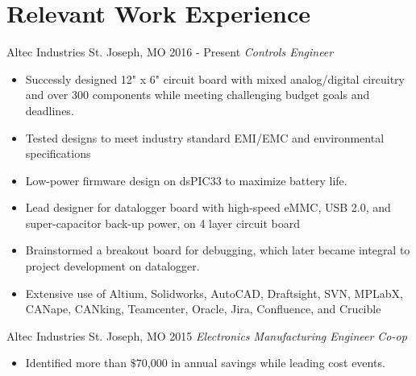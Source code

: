 \documentclass[]{bergman-cv} %
\begin{document}
\section{Relevant Work Experience}
\begin{entrylist}
\entry
{Altec Industries}
{St. Joseph, MO}
{2016 - Present}
{\emph{Controls Engineer}}
{\begin{itemize}	\setlength\itemsep{0.25em} \vspace*{-5pt}
	\item Successly designed 12" x 6" circuit board with mixed analog/digital circuitry and over 300 components while meeting challenging budget goals and deadlines.
	
	
	\item Tested designs to meet industry standard EMI/EMC and environmental specifications
	\item Low-power firmware design on dsPIC33 to maximize battery life.
	\item Lead designer for datalogger board with high-speed eMMC, USB 2.0, and super-capacitor back-up power, on 4 layer circuit board
	\item Brainstormed a breakout board for debugging, which later became integral to project development on datalogger.
	\item Extensive use of Altium, Solidworks, AutoCAD, Draftsight, SVN, MPLabX, CANape, CANking, Teamcenter, Oracle, Jira, Confluence, and Crucible
\end{itemize}}
\vspace{6pt}
\entry
{Altec Industries}
{St. Joseph, MO}
{2015}
{\emph{Electronics Manufacturing Engineer Co-op}}
{\begin{itemize}	\setlength\itemsep{0.25em} \vspace*{-5pt}
	\item Identified more than $\$$70,000 in annual savings while leading cost events.


\end{itemize}}
\end{entrylist}
\end{document}
